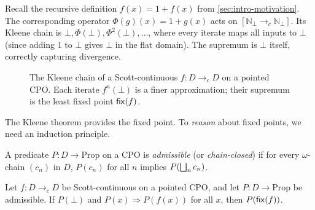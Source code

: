 \begin{example}
\label{ex:fixp-divergence}
Recall the recursive definition $f(x) = 1 + f(x)$ from
\cref{sec:intro-motivation}. The corresponding operator
$\Phi(g)(x) = 1 + g(x)$ acts on $[\mathbb{N}_\bot \to_{c} \mathbb{N}_\bot]$.
Its Kleene chain is $\bot, \Phi(\bot), \Phi^2(\bot), \ldots$, where every
iterate maps all inputs to $\bot$ (since adding $1$ to $\bot$ gives $\bot$
in the flat domain). The supremum is $\bot$ itself, correctly capturing
divergence.
\end{example}

\begin{figure}[h]
\centering
{}
\caption{The Kleene chain of a Scott-continuous $f : D \to_c D$ on a
  pointed CPO.  Each iterate $f^n(\bot)$ is a finer approximation;
  their supremum is the least fixed point $\mathsf{fix}(f)$.}
\label{fig:kleene-chain}
\end{figure}

The Kleene theorem provides the fixed point. To \emph{reason} about fixed
points, we need an induction principle.

\begin{definition}
\label{def:admissible}
A predicate $P : D \to \mathrm{Prop}$ on a CPO is \emph{admissible}
(or \emph{chain-closed}) if for every $\omega$-chain $(c_n)$ in $D$,
$P(c_n)$ for all $n$ implies $P(\bigsqcup_n c_n)$.
\end{definition}

\begin{theorem}
\label{thm:scott-induction}
Let $f : D \to_{c} D$ be Scott-continuous on a pointed CPO, and let
$P : D \to \mathrm{Prop}$ be admissible. If $P(\bot)$ and
$P(x) \Rightarrow P(f(x))$ for all $x$, then $P(\mathsf{fix}(f))$.
\end{theorem}

